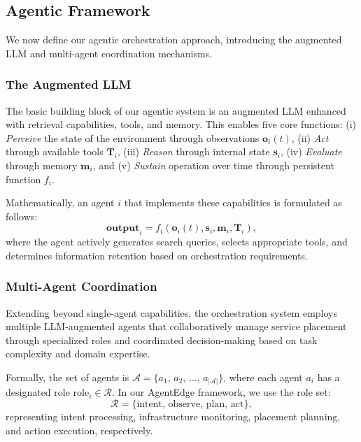 \subsection{Agentic Framework}
\label{subsec:ch5_agentic_framework}

We now define our agentic orchestration approach, introducing the augmented \ac{LLM} and multi-agent coordination mechanisms.

\subsubsection{The Augmented LLM}

The basic building block of our agentic system is an augmented \ac{LLM} enhanced with retrieval capabilities, tools, and memory. This enables five core functions: (i) \textit{Perceive} the state of the environment through observations $\mathbf{o}_i(t)$, (ii) \textit{Act} through available tools $\mathbf{T}_i$, (iii) \textit{Reason} through internal state $\mathbf{s}_i$, (iv) \textit{Evaluate} through memory $\mathbf{m}_i$, and (v) \textit{Sustain} operation over time through persistent function $f_i$. 

Mathematically, an agent $i$ that implements these capabilities is formulated as follows:
\begin{equation}
\mathbf{output}_i = f_i(\mathbf{o}_i(t), \mathbf{s}_i, \mathbf{m}_i, \mathbf{T}_i),
\label{eq:ch5_agent_update}
\end{equation}
where the agent actively generates search queries, selects appropriate tools, and determines information retention based on orchestration requirements.

\subsubsection{Multi-Agent Coordination}

Extending beyond single-agent capabilities, the orchestration system employs multiple \ac{LLM}-augmented agents that collaboratively manage service placement through specialized roles and coordinated decision-making based on task complexity and domain expertise.

Formally, the set of agents is $\mathcal{A} = \{a_1,\, a_2,\, \ldots,\, a_{|\mathcal{A}|}\}$, where each agent $a_i$ has a designated role $\text{role}_i \in \mathcal{R}$. In our \ac{AgentEdge} framework, we use the role set:
\begin{equation}
\mathcal{R} = \{\text{intent},\, \text{observe},\, \text{plan},\, \text{act}\},
\label{eq:ch5_roles}
\end{equation}
representing intent processing, infrastructure monitoring, placement planning, and action execution, respectively.

